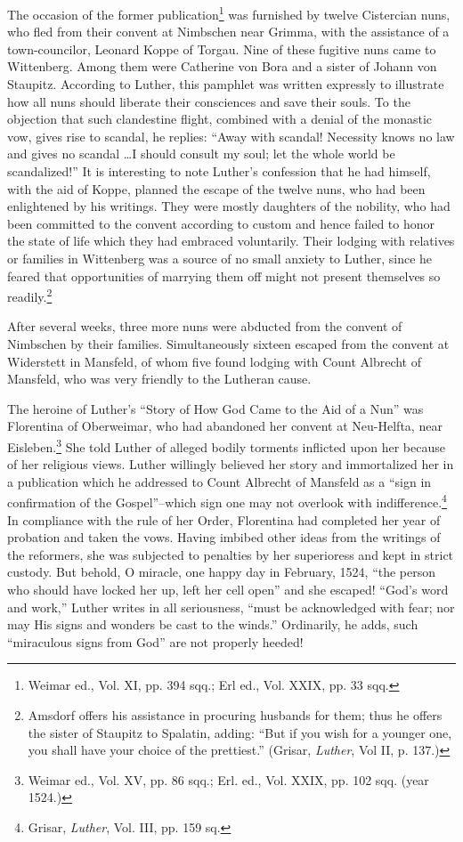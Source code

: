The occasion of the former publication\footnote
{Weimar ed., Vol. XI, pp. 394 sqq.; Erl ed., Vol. XXIX, pp. 33 sqq.}
was furnished by twelve
Cistercian nuns, who fled from their convent at Nimbschen near
Grimma, with the assistance of a town-councilor, Leonard Koppe of
Torgau. Nine of these fugitive nuns came to Wittenberg. Among
them were Catherine von Bora and a sister of Johann von Staupitz.
According to Luther, this pamphlet was written expressly to illustrate
how all nuns should liberate their consciences and save their
souls. To the objection that such clandestine flight, combined with
a denial of the monastic vow, gives rise to scandal, he replies: “Away
with scandal! Necessity knows no law and gives no scandal \dots I
should consult my soul; let the whole world be scandalized!” It
is interesting to note Luther’s confession that he had himself, with
the aid of Koppe, planned the escape of the twelve nuns, who had
been enlightened by his writings. They were mostly daughters of
the nobility, who had been committed to the convent according to
custom and hence failed to honor the state of life which they had
embraced voluntarily. Their lodging with relatives or families in
Wittenberg was a source of no small anxiety to Luther, since he
feared that opportunities of marrying them off might not present
themselves so readily.\footnote
{Amsdorf offers his assistance in procuring husbands for them; thus he offers the sister
of Staupitz to Spalatin, adding: “But if you wish for a younger one, you shall have your
choice of the prettiest.” (Grisar, \textit{Luther}, Vol II, p. 137.)}


After several weeks, three more nuns were abducted from the
convent of Nimbschen by their families. Simultaneously sixteen
escaped from the convent at Widerstett in Mansfeld, of whom five
found lodging with Count Albrecht of Mansfeld, who was very
friendly to the Lutheran cause.

The heroine of Luther’s “Story of How God Came to the Aid of
a Nun” was Florentina of Oberweimar, who had abandoned her
convent at Neu-Helfta, near Eisleben.\footnote{Weimar ed., Vol. XV, pp. 86 sqq.; Erl. ed., Vol. XXIX, pp. 102 sqq. (year 1524.)}
She told Luther of alleged
bodily torments inflicted upon her because of her religious views.
Luther willingly believed her story and immortalized her in a publication
which he addressed to Count Albrecht of Mansfeld as a “sign
in confirmation of the Gospel”--which sign one may not overlook
with indifference.\footnote{Grisar, \textit{Luther}, Vol. III, pp. 159 sq.}
In compliance with the rule of her Order,
Florentina had completed her year of probation and taken the vows.
Having imbibed other ideas from the writings of the reformers,
she was subjected to penalties by her superioress and kept in strict
custody. But behold, O miracle, one happy day in February, 1524,
“the person who should have locked her up, left her cell open” and
she escaped! “God’s word and work,” Luther writes in all seriousness,
“must be acknowledged with fear; nor may His signs and
wonders be cast to the winds.” Ordinarily, he adds, such “miraculous
signs from God” are not properly heeded!

